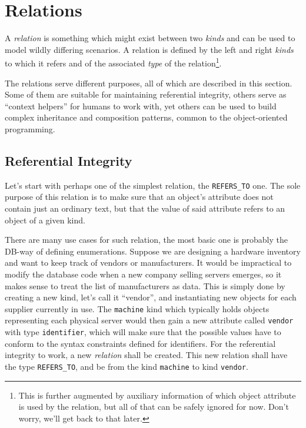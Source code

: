 \documentclass[deska]{subfiles}
\begin{document}
\section{Relations}
\label{sec:objects-and-relations-relations}

A {\em relation} is something which might exist between two {\em kinds} and can be used to model wildly differing
scenarios.  A relation is defined by the left and right {\em kinds} to which it refers and of the associated {\em type}
of the relation\footnote{This is further augmented by auxiliary information of which object attribute is used by the
relation, but all of that can be safely ignored for now.  Don't worry, we'll get back to that later.}.

The relations serve different purposes, all of which are described in this section.  Some of them are suitable for
maintaining referential integrity, others serve as ``context helpers'' for humans to work with, yet others can be used
to build complex inheritance and composition patterns, common to the object-oriented programming.

\subsection{Referential Integrity}

Let's start with perhaps one of the simplest relation, the {\tt REFERS\_TO} one.  The sole purpose of this relation is
to make sure that an object's attribute does not contain just an ordinary text, but that the value of said attribute
refers to an object of a given kind.

There are many use cases for such relation, the most basic one is probably the DB-way of defining enumerations.  Suppose
we are designing a hardware inventory and want to keep track of vendors or manufacturers.  It would be impractical to
modify the database code when a new company selling servers emerges, so it makes sense to treat the list of
manufacturers as data.  This is simply done by creating a new kind, let's call it ``vendor'', and instantiating new
objects for each supplier currently in use.  The {\tt machine} kind which typically holds objects representing each
physical server would then gain a new attribute called {\tt vendor} with type {\tt identifier}, which will make sure
that the possible values have to conform to the syntax constraints defined for identifiers.  For the referential
integrity to work, a new {\em relation} shall be created.  This new relation shall have the type {\tt REFERS\_TO}, and
be from the kind {\tt machine} to kind {\tt vendor}.
\end{document}
